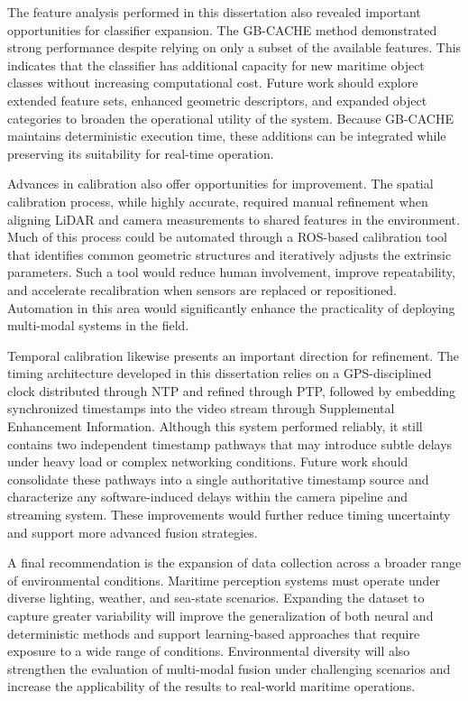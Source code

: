 \documentclass{erauthesis}
\begin{document}
The feature analysis performed in this dissertation also revealed important opportunities for classifier expansion. The GB-CACHE method demonstrated strong performance despite relying on only a subset of the available features. This indicates that the classifier has additional capacity for new maritime object classes without increasing computational cost. Future work should explore extended feature sets, enhanced geometric descriptors, and expanded object categories to broaden the operational utility of the system. Because GB-CACHE maintains deterministic execution time, these additions can be integrated while preserving its suitability for real-time operation.

Advances in calibration also offer opportunities for improvement. The spatial calibration process, while highly accurate, required manual refinement when aligning LiDAR and camera measurements to shared features in the environment. Much of this process could be automated through a ROS-based calibration tool that identifies common geometric structures and iteratively adjusts the extrinsic parameters. Such a tool would reduce human involvement, improve repeatability, and accelerate recalibration when sensors are replaced or repositioned. Automation in this area would significantly enhance the practicality of deploying multi-modal systems in the field.

Temporal calibration likewise presents an important direction for refinement. The timing architecture developed in this dissertation relies on a GPS-disciplined clock distributed through NTP and refined through PTP, followed by embedding synchronized timestamps into the video stream through Supplemental Enhancement Information. Although this system performed reliably, it still contains two independent timestamp pathways that may introduce subtle delays under heavy load or complex networking conditions. Future work should consolidate these pathways into a single authoritative timestamp source and characterize any software-induced delays within the camera pipeline and streaming system. These improvements would further reduce timing uncertainty and support more advanced fusion strategies.

A final recommendation is the expansion of data collection across a broader range of environmental conditions. Maritime perception systems must operate under diverse lighting, weather, and sea-state scenarios. Expanding the dataset to capture greater variability will improve the generalization of both neural and deterministic methods and support learning-based approaches that require exposure to a wide range of conditions. Environmental diversity will also strengthen the evaluation of multi-modal fusion under challenging scenarios and increase the applicability of the results to real-world maritime operations.
\end{document}
